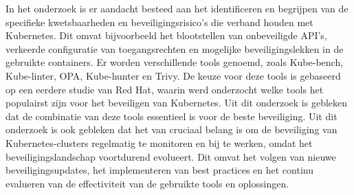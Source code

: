 In het onderzoek is er aandacht besteed aan het identificeren en begrijpen van de specifieke kwetsbaarheden en beveiligingsrisico's die verband houden met Kubernetes. Dit omvat bijvoorbeeld het blootstellen van onbeveiligde API's, verkeerde configuratie van toegangsrechten en mogelijke beveiligingslekken in de gebruikte containers. Er worden verschillende tools genoemd, zoals Kube-bench, Kube-linter, OPA, Kube-hunter en Trivy. De keuze voor deze tools is gebaseerd op een eerdere studie van Red Hat, waarin werd onderzocht welke tools het populairst zijn voor het beveiligen van Kubernetes. Uit dit onderzoek is gebleken dat de combinatie van deze tools essentieel is voor de beste beveiliging. Uit dit onderzoek is ook gebleken dat het van cruciaal belang is om de beveiliging van Kubernetes-clusters regelmatig te monitoren en bij te werken, omdat het beveiligingslandschap voortdurend evolueert. Dit omvat het volgen van nieuwe beveiligingsupdates, het implementeren van best practices en het continu evalueren van de effectiviteit van de gebruikte tools en oplossingen.
